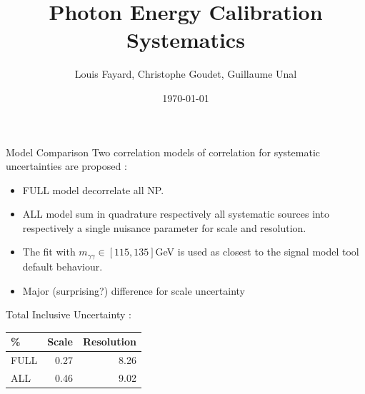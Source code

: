 \documentclass[a4paper]{beamer}
\title[$H\gamma\gamma$ couplings]{Photon Energy Calibration Systematics}
\author[Fayard,Goudet,Unal]{Louis Fayard, Christophe Goudet, Guillaume Unal}
\institute[LAL]{\texttt{[image: /home/goudet/Documents/LAL/ExternalPlot/LAL.jpg]} }
\date{\today}
\begin{document}
\transboxin
\begin{frame}
\maketitle
\end{frame}

%

\begin{frame}{Model Comparison}
    Two correlation models of correlation for systematic uncertainties are proposed : 
  \begin{itemize}
  \item FULL model decorrelate all NP.
  \item ALL model sum in quadrature respectively all systematic sources into respectively a single nuisance parameter for scale and resolution.
  \item The fit with $m_{\gamma\gamma}\in[115,135]$GeV is used as closest to the signal model tool default behaviour.
  \item Major (surprising?) difference for scale uncertainty
  \end{itemize}
  \begin{center}
    Total Inclusive Uncertainty :\\
    \begin{tabular}{l|rr}
      \% & Scale & Resolution \\
      \hline
      FULL & 0.27 & 8.26 \\
      ALL & 0.46 & 9.02 \\
    \end{tabular}
  \end{center}
\end{frame}
\end{document}
